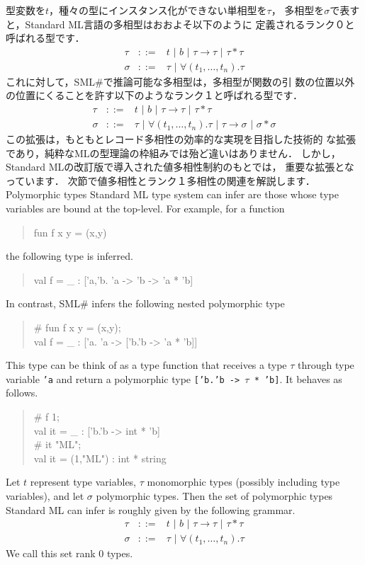 \documentclass{jbook}
\newcommand{\smlsharp}{SML\#}
\newcommand{\func}{\rightarrow}
\newcommand{\vbar}{\mbox{\ |\ }}
\newenvironment{program}{\begin{tt}\begin{quote}}{\end{quote}\end{tt}}
\begin{document}
	型変数を$t$，種々の型にインスタンス化ができない単相型を$\tau$，
多相型を$\sigma$で表すと，Standard ML言語の多相型はおおよそ以下のように
定義されるランク０と呼ばれる型です．
\begin{eqnarray*}
\tau &::=& t \vbar b \vbar \tau \func \tau \vbar \tau * \tau
\\
\sigma &::=& \tau \vbar \forall (t_1,\ldots,t_n).\tau
\end{eqnarray*}
	これに対して，\smlsharp{}で推論可能な多相型は，多相型が関数の引
数の位置以外の位置にくることを許す以下のようなランク１と呼ばれる型です．
\begin{eqnarray*}
\tau &::=& t \vbar b \vbar \tau \func \tau \vbar \tau * \tau
\\
\sigma &::=& \tau \vbar \forall (t_1,\ldots,t_n).\tau 
\vbar \tau \func \sigma
\vbar \sigma * \sigma 
\end{eqnarray*}
	この拡張は，もともとレコード多相性の効率的な実現を目指した技術的
な拡張であり，純粋なMLの型理論の枠組みでは殆ど違いはありません．
	しかし，Standard MLの改訂版で導入された値多相性制約のもとでは，
重要な拡張となっています．
	次節で値多相性とランク１多相性の関連を解説します．
\else%
	Polymorphic types Standard ML type system can infer are those
whose type variables are bound at the top-level.
	For example, for a function
\begin{program}
fun f x y = (x,y)
\end{program}
the following type is inferred.
\begin{program}
val f = \_ : ['a,'b. 'a -> 'b -> 'a * 'b]
\end{program}
	In contrast, \smlsharp{} infers the following nested
polymorphic type
\begin{program}
\# fun f x y = (x,y);\\
val f = \_ : ['a. 'a -> ['b.'b -> 'a * 'b]]
\end{program}
	This type can be think of as a type function that receives a
type $\tau$ through type variable {\tt 'a} and return a polymorphic type
{\tt ['b.'b -> $\tau$ * 'b]}.
	It behaves as follows.
\begin{program}
\# f 1;\\
val it = \_ : ['b.'b -> int * 'b]\\
\# it "ML";\\
val it = (1,"ML") : int * string
\end{program}

	Let $t$ represent type variables,
$\tau$ monomorphic types (possibly including type variables), and let
$\sigma$ polymorphic types.
	Then the set of polymorphic types Standard ML can infer is
roughly given by the following grammar. 
\begin{eqnarray*}
\tau &::=& t \vbar b \vbar \tau \func \tau \vbar \tau * \tau
\\
\sigma &::=& \tau \vbar \forall (t_1,\ldots,t_n).\tau
\end{eqnarray*}
	We call this set rank 0 types.
\end{document}
